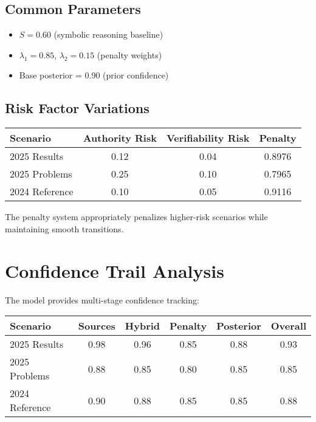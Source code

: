 \documentclass[12pt,a4paper]{article}
\begin{document}
\subsection{Common Parameters}
\begin{itemize}
    \item $S = 0.60$ (symbolic reasoning baseline)
    \item $\lambda_1 = 0.85$, $\lambda_2 = 0.15$ (penalty weights)
    \item Base posterior = 0.90 (prior confidence)
\end{itemize}

\subsection{Risk Factor Variations}
\begin{center}
\begin{tabular}{@{}lccc@{}}
\toprule
Scenario & Authority Risk & Verifiability Risk & Penalty \\
\midrule
2025 Results & 0.12 & 0.04 & 0.8976 \\
2025 Problems & 0.25 & 0.10 & 0.7965 \\
2024 Reference & 0.10 & 0.05 & 0.9116 \\
\bottomrule
\end{tabular}
\end{center}

The penalty system appropriately penalizes higher-risk scenarios while maintaining smooth transitions.

\section{Confidence Trail Analysis}

The model provides multi-stage confidence tracking:

\begin{center}
\begin{tabular}{@{}lccccc@{}}
\toprule
Scenario & Sources & Hybrid & Penalty & Posterior & Overall \\
\midrule
2025 Results & 0.98 & 0.96 & 0.85 & 0.88 & 0.93 \\
2025 Problems & 0.88 & 0.85 & 0.80 & 0.85 & 0.85 \\
2024 Reference & 0.90 & 0.88 & 0.85 & 0.85 & 0.88 \\
\bottomrule
\end{tabular}
\end{center}
\end{document}
